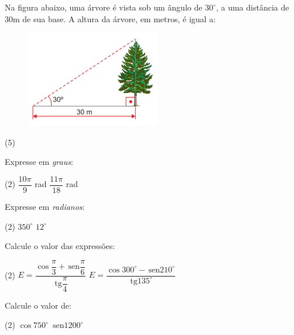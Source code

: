 \documentclass[a4paper,11pt,addpoints]{exam}
\providecommand{\sin}{} \renewcommand{\sin}{\hspace{2pt}\mathrm{sen}}
\providecommand{\tan}{} \renewcommand{\tan}{\hspace{2pt}\mathrm{tg}}
\begin{document}
\begin{questions}

\question
Na figura abaixo, uma árvore é vista sob um ângulo de $30^\circ$, a uma distância de $30$m de sua base. A altura da árvore, em metros, é igual a: 

\begin{figure}[H]
  \centering
  \includegraphics[width=.4\linewidth]{figures/1.png}
\end{figure}

\begin{tasks}(5)
\end{tasks}


\question
Expresse em \textit{graus}:

\begin{tasks}(2)
  \task $\dfrac{10\pi}{9}$ rad
  \task $\dfrac{11\pi}{18}$ rad
\end{tasks}


\question
Expresse em \textit{radianos}:

\begin{tasks}(2)
  \task $350^\circ$
  \task $12^\circ$
\end{tasks}


\question
Calcule o valor das expressões:

\begin{tasks}(2)
  \task $E = \dfrac{\cos \dfrac{\pi}{3} + \sin \dfrac{\pi}{6}}{\tan \dfrac{\pi}{4}}$
  \task $E = \dfrac{\cos 300^\circ - \sin 210^\circ}{\tan 135^\circ}$
\end{tasks}


\question
Calcule o valor de:

\begin{tasks}(2)
  \task $\cos 750^\circ$
  \task $\sin 1200^\circ$
\end{tasks}

\end{questions}
\end{document}
